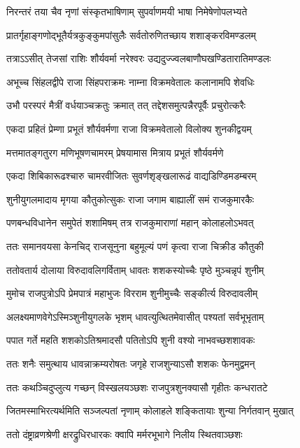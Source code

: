 \twolineshloka
{निरन्तरं तया चैव नृणां संस्कृतभाषिणाम्}
{सुपर्वाणमयी भाषा निमेषेणोपलभ्यते} %

\twolineshloka
{प्रातर्गृहाङ्गणोद्भूतैर्यत्रकुङ्कुमपांसुलैः}
{सर्वतोरुणितच्छाय शशाङ्करविमण्डलम्} %

\twolineshloka
{तत्राऽऽसीत् तेजसां राशिः शौर्यवर्मा नरेश्वरः}
{उद्यदुज्ज्वलबाणौघखण्डितारातिमण्डलः} %

\twolineshloka
{अभूच्च सिंहलद्वीपे राजा सिंहपराक्रमः}
{नाम्ना विक्रमवेतालः कलानामपि शेवधिः} %

\twolineshloka
{उभौ परस्परं मैत्रीं वर्धयाञ्चक्रतुः क्रमात्}
{तत् तद्देशसमुत्पन्नैरपूर्वैः प्रचुरोत्करैः} %

\twolineshloka
{एकदा प्रहितं प्रेम्णा प्रभूतं शौर्यवर्मणा}
{राजा विक्रमवेतालो विलोक्य शुनकीद्वयम्} %

\twolineshloka
{मत्तमातङ्गतुरग मणिभूषणचामरम्}
{प्रेषयामास मित्राय प्रभूतं शौर्यवर्मणे} %

\twolineshloka
{एकदा शिबिकारूढश्चारु चामरवीजितः}
{सुवर्णशृङ्खलारूढं वाद्यडिण्डिमडम्बरम्} %

\twolineshloka
{शुनीयुगलमादाय मृगया कौतुकोत्सुकः}
{राजा जगाम बाह्यालीं समं राजकुमारकैः} %

\twolineshloka
{पणबन्धविधानेन समुपेतं शशामिषम्}
{तत्र राजकुमाराणां महान् कोलाहलोऽभवत्} %

\twolineshloka
{ततः समानवयसा केनचिद् राजसूनुना}
{बहुमूल्यं पणं कृत्वा राजा चिक्रीड कौतुकी} %

\twolineshloka
{ततोवतार्य दोलाया विरुदावलिगर्विताम्}
{धावतः शशकस्योच्चैः पृष्ठे मुञ्चन्नृपं शुनीम्} %

\twolineshloka
{मुमोच राजपुत्रोऽपि प्रेमपात्रं महाभुजः}
{विरराम शुनीमुच्चैः सङ्कीर्त्य विरुदावलीम्} %

\twolineshloka
{अलक्ष्यमाणवेगेऽस्मिञ्शुनीयुगलके भृशम्}
{धावत्युत्थितमेवासीत् पश्यतां सर्वभूभृताम्} %

\twolineshloka
{पपात गर्ते महति शशकोऽतिश्रमादसौ}
{पतितोऽपि शुनी वश्यो नाभवच्छशशावकः} %

\twolineshloka
{ततः शनैः समुत्थाय धावन्नाक्रम्यरोषतः}
{जगृहे राजशुन्याऽसौ शशकः फेनमुद्वमन्} %

\twolineshloka
{ततः कथञ्चिदुप्लुत्य गच्छन् विस्खलयञ्छशः}
{राजपुत्रशुनक्यासौ गृहीतः कन्धरातटे} %

\twolineshloka
{जितमस्माभिरत्यर्थमिति सञ्जल्पतां नृणाम्}
{कोलाहले शङ्कितायाः शुन्या निर्गतवान् मुखात्} %

\twolineshloka
{ततो दंष्ट्राव्रणश्रेणी क्षरद्रुधिरधारकः}
{क्वापि मर्मरभूभागे निलीय स्थितवाञ्छशः} %

